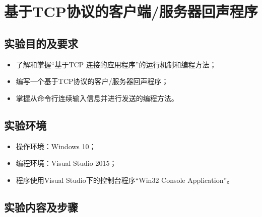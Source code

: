 \documentclass[a4paper]{ctexrep}
\begin{document}
\chapter{基于TCP协议的客户端/服务器回声程序}
\begin{spacing}{1.5}
\songti{}
\section{实验目的及要求}
\begin{itemize}
	\item 了解和掌握“基于TCP 连接的应用程序”的运行机制和编程方法；
	\item 编写一个基于TCP协议的客户/服务器回声程序；
	\item 掌握从命令行连续输入信息并进行发送的编程方法。
\end{itemize}
\section{实验环境}
\begin{itemize}
	\item 操作环境：Windows 10；
	\item 编程环境：Visual Studio 2015；
	\item 程序使用Visual Studio下的控制台程序“Win32 Console Application”。
\end{itemize}
\section{实验内容及步骤}

\end{spacing}
\end{document}
